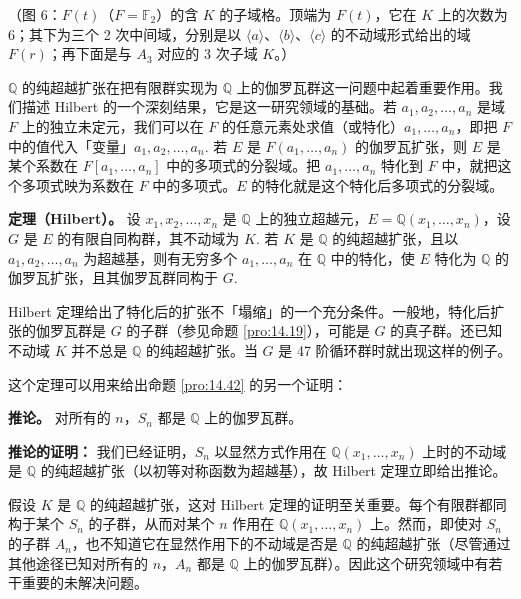 \begin{center}
（图 6：\(F(t)\)（\(F = \mathbb{F}_2\)）的含 \(K\) 的子域格。顶端为 \(F(t)\)，它在 \(K\) 上的次数为 6；其下为三个 2 次中间域，分别是以 \(\langle a\rangle\)、\(\langle b\rangle\)、\(\langle c\rangle\) 的不动域形式给出的域 \(F(r)\)；再下面是与 \(A_3\) 对应的 3 次子域 \(K\)。）
\end{center}

\(\mathbb{Q}\) 的纯超越扩张在把有限群实现为 \(\mathbb{Q}\) 上的伽罗瓦群这一问题中起着重要作用。我们描述 Hilbert 的一个深刻结果，它是这一研究领域的基础。若 \(a_1, a_2, \ldots, a_n\) 是域 \(F\) 上的独立未定元，我们可以在 \(F\) 的任意元素处求值（或特化）\(a_1, \ldots, a_n\)，即把 \(F\) 中的值代入「变量」\(a_1, a_2, \ldots, a_n\). 若 \(E\) 是 \(F(a_1, \ldots, a_n)\) 的伽罗瓦扩张，则 \(E\) 是某个系数在 \(F[a_1, \ldots, a_n]\) 中的多项式的分裂域。把 \(a_1, \ldots, a_n\) 特化到 \(F\) 中，就把这个多项式映为系数在 \(F\) 中的多项式。\(E\) 的特化就是这个特化后多项式的分裂域。

\noindent\textbf{定理（Hilbert）。} 设 \(x_1, x_2, \ldots, x_n\) 是 \(\mathbb{Q}\) 上的独立超越元，\(E = \mathbb{Q}(x_1, \ldots, x_n)\)，设 \(G\) 是 \(E\) 的有限自同构群，其不动域为 \(K\). 若 \(K\) 是 \(\mathbb{Q}\) 的纯超越扩张，且以 \(a_1, a_2, \ldots, a_n\) 为超越基，则有无穷多个 \(a_1, \ldots, a_n\) 在 \(\mathbb{Q}\) 中的特化，使 \(E\) 特化为 \(\mathbb{Q}\) 的伽罗瓦扩张，且其伽罗瓦群同构于 \(G\).

Hilbert 定理给出了特化后的扩张不「塌缩」的一个充分条件。一般地，特化后扩张的伽罗瓦群是 \(G\) 的子群（参见命题 \ref{pro:14.19}），可能是 \(G\) 的真子群。还已知不动域 \(K\) 并不总是 \(\mathbb{Q}\) 的纯超越扩张。当 \(G\) 是 47 阶循环群时就出现这样的例子。

这个定理可以用来给出命题 \ref{pro:14.42} 的另一个证明：

\noindent\textbf{推论。} 对所有的 \(n\)，\(S_n\) 都是 \(\mathbb{Q}\) 上的伽罗瓦群。

\noindent\textbf{推论的证明：} 我们已经证明，\(S_n\) 以显然方式作用在 \(\mathbb{Q}(x_1, \ldots, x_n)\) 上时的不动域是 \(\mathbb{Q}\) 的纯超越扩张（以初等对称函数为超越基），故 Hilbert 定理立即给出推论。

假设 \(K\) 是 \(\mathbb{Q}\) 的纯超越扩张，这对 Hilbert 定理的证明至关重要。每个有限群都同构于某个 \(S_n\) 的子群，从而对某个 \(n\) 作用在 \(\mathbb{Q}(x_1, \ldots, x_n)\) 上。然而，即使对 \(S_n\) 的子群 \(A_n\)，也不知道它在显然作用下的不动域是否是 \(\mathbb{Q}\) 的纯超越扩张（尽管通过其他途径已知对所有的 \(n\)，\(A_n\) 都是 \(\mathbb{Q}\) 上的伽罗瓦群）。因此这个研究领域中有若干重要的未解决问题。

